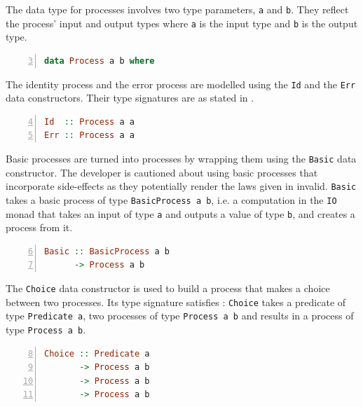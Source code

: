The data type for processes involves two type parameters, \texttt{a} and \texttt{b}. They reflect the process' input and output types where \texttt{a} is the input type and \texttt{b} is the output type.
\begin{lstlisting}[language=Haskell,caption=Data type for the representation of processes.,label=fig:local_datatypes,numbers=left,frame=bt,firstnumber=3]
data Process a b where
\end{lstlisting}

The identity process and the error process are modelled using the \texttt{Id} and the \texttt{Err} data constructors. Their type signatures are as stated in .
\begin{lstlisting}[language=Haskell,caption=Signatures of the \texttt{Id} and \texttt{Err} data constructors.,label=fig:local_datatypes,numbers=left,frame=bt,firstnumber=4]
Id  :: Process a a
Err :: Process a a
\end{lstlisting}

Basic processes are turned into processes by wrapping them using the \texttt{Basic} data constructor. The developer is cautioned about using basic processes that incorporate side-effects as they potentially render the laws given in  invalid. \texttt{Basic} takes a basic process of type \texttt{BasicProcess a b}, i.e. a computation in the \texttt{IO} monad that takes an input of type \texttt{a} and outputs a value of type \texttt{b}, and creates a process from it.
\begin{lstlisting}[language=Haskell,caption=Signature of the \texttt{Basic} data constructor.,numbers=left,frame=bt,firstnumber=6]
Basic :: BasicProcess a b
      -> Process a b
\end{lstlisting}

The \texttt{Choice} data constructor is used to build a process that makes a choice between two processes. Its type signature satisfies : \texttt{Choice} takes a predicate of type \texttt{Predicate a}, two processes of type \texttt{Process a b} and results in a process of type \texttt{Process a b}.
\begin{lstlisting}[language=Haskell,caption=Signature of the \texttt{Choice} data constructor.,numbers=left,frame=bt,firstnumber=8]
Choice :: Predicate a
       -> Process a b
       -> Process a b
       -> Process a b
\end{lstlisting}

